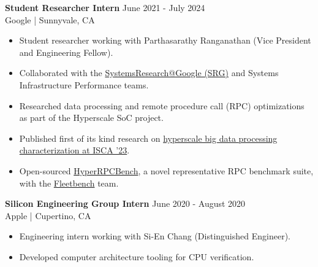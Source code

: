 \documentclass[line]{res}
\begin{document}
\begin{resume}
\textbf{Student Researcher Intern} \hfill June 2021 - July 2024
\\
Google | Sunnyvale, CA
\\
\vspace{-3mm}
\begin{itemize}
\item Student researcher working with Parthasarathy Ranganathan (Vice President and Engineering Fellow).
\item Collaborated with the \href{https://techsysinfra.google/research/}{SystemsResearch@Google (SRG)} and Systems Infrastructure Performance teams.
\item Researched data processing and remote procedure call (RPC) optimizations as part of the Hyperscale SoC project.
\item Published first of its kind research on \href{https://dl.acm.org/doi/10.1145/3579371.3589082}{hyperscale big data processing characterization at ISCA '23}.
\item Open-sourced \href{https://github.com/google/fleetbench/tree/cd20746b68b307b148a761c676d6400f2541082d/fleetbench/rpc}{HyperRPCBench}, a novel representative RPC benchmark suite, with the \href{https://github.com/google/fleetbench}{Fleetbench} team.
\end{itemize}

\vspace{-3mm}

\textbf{Silicon Engineering Group Intern} \hfill June 2020 - August 2020
\\
Apple | Cupertino, CA
\\
\vspace{-3mm}
\begin{itemize}
\item Engineering intern working with Si-En Chang (Distinguished Engineer).
\item Developed computer architecture tooling for CPU verification.
\end{itemize}

\vspace{-3mm}



\end{resume}
\end{document}
